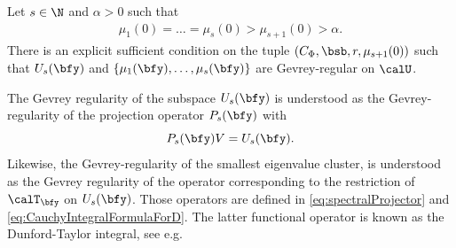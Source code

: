 \begin{theorem} \label{theorem:main}
 Let $ s \in \N$ and $\alpha > 0$ such that
    \begin{align}\label{eq:choiceofs}
        \mu_1(0) = \ldots = \mu_s(0) > \mu_{s+1}(0) > \alpha.
    \end{align}
There is an explicit sufficient condition on the tuple $(C_{\Phi}, \bsb, r, \mu_{s+1}(0))$ such that $U_s(\bfy) $ and $ \{\mu_1(\bfy) ,\ldots, \mu_s(\bfy)\}$ are Gevrey-regular on $\calU$.
\end{theorem}
The Gevrey regularity of the subspace $U_s(\bfy)$ is understood as the Gevrey-regularity of the projection operator $P_s(\bfy)$ with
\begin{equation*}
    P_s(\bfy) V = U_s(\bfy).
\end{equation*} Likewise, the Gevrey-regularity of the smallest eigenvalue cluster, is understood as the Gevrey regularity of the operator corresponding to the restriction of $\calT_\bfy$ on $U_s(\bfy)$. Those operators are defined in  \eqref{eq:spectralProjector} and \eqref{eq:CauchyIntegralFormulaForD}. The latter functional operator is known as the Dunford-Taylor integral, see e.g. \cite[Chapter 1, \S 2- \S 6] {kato1995perturbation}


